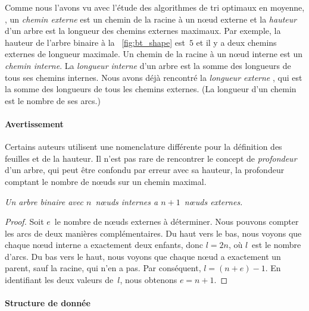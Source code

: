 Comme nous l'avons vu avec l'étude des algorithmes de tri optimaux en
moyenne, , un \emph{chemin
  externe} est un chemin de la racine à un
nœud externe et la
\emph{hauteur} d'un arbre est la longueur des
chemins externes maximaux. Par exemple, la hauteur de l'arbre binaire
à la \fig~\vref{fig:bt_shape} est~\(5\) et il y a deux chemins
externes de longueur maximale. Un chemin de la racine à un nœud
interne est un \emph{chemin interne}. La
\emph{longueur interne} d'un arbre est
la somme des longueurs de tous ses chemins internes. Nous avons déjà
rencontré la \emph{longueur externe} ,
qui est la somme des longueurs de tous les chemins externes. (La
longueur d'un chemin est le nombre de ses arcs.)

\paragraph{Avertissement}

Certains auteurs utilisent une nomenclature différente pour la
définition des feuilles et de la hauteur. Il n'est pas rare de
rencontrer le concept de \emph{profondeur} d'un arbre, qui peut être confondu par erreur
avec sa hauteur, la profondeur comptant le nombre de nœuds sur un
chemin maximal.
\begin{thm}%
\label{thm_int_ext}
\textsl{Un arbre binaire avec \(n\)~nœuds internes a
  \(n+1\)~nœuds externes.}
\end{thm}
\begin{proof}
  Soit \(e\)~le nombre de nœuds externes à déterminer. Nous
  pouvons compter les arcs de deux manières complémentaires. Du haut
  vers le bas, nous voyons que chaque nœud interne a exactement
  deux enfants, donc \(l=2n\), où \(l\)~est le nombre d'arcs. Du bas
  vers le haut, nous voyons que chaque nœud a exactement un
  parent, sauf la racine, qui n'en a pas. Par conséquent,
  \(l=(n+e)-1\). En identifiant les deux valeurs de~\(l\), nous
  obtenons \(e=n+1\).
\end{proof}

\paragraph{Structure de donnée}

